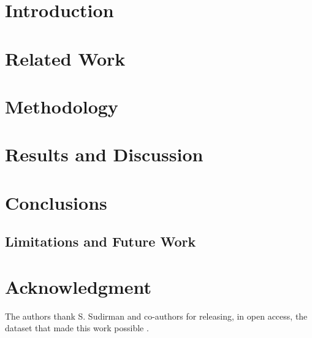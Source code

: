 \documentclass[conference,letterpaper]{IEEEtran}
\begin{document}
\section{Introduction}


\section{Related Work}
\label{sec:related}


\section{Methodology}
\label{sec:methodology}



\section{Results and Discussion}
\label{sec:results}


\section{Conclusions}
\label{sec:conclusions}


\subsection{Limitations and Future Work}


\section*{Acknowledgment}
The authors thank S. Sudirman and co-authors for releasing, in open access, the dataset that made this work possible \cite{sudirman2019}.



\end{document}
